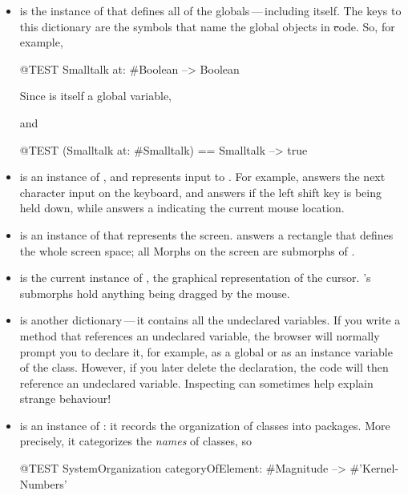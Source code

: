 \documentclass[a4paper,10pt,twoside]{book}
\begin{document}
\begin{itemize}
\item
{} is the instance of  that defines all of the globals\,---\,including  itself.   
The keys to this dictionary are the symbols that name the global objects in \st code.
So, for example,
\begin{code}{@TEST}
Smalltalk at: #Boolean --> Boolean
\end{code}
Since  is itself a global variable,
\begin{code}{}
Smalltalk at: #Smalltalk-->a SystemDictionary(lots of globals)}
\end{code} 
and
\begin{code}{@TEST}
(Smalltalk at: #Smalltalk) == Smalltalk --> true
\end{code}

\item {} is an instance of , and represents input to \squeak.
For example,  answers the next character input on the keyboard, and  answers  if the left shift key is being held down, while  answers a  indicating the current mouse location.

\item {} is an instance of  that represents the screen.
 answers a rectangle that defines the whole screen space; all Morphs on the screen are submorphs of .

\item 
{} is the current instance of , the graphical representation of the cursor.  's submorphs hold anything being dragged by the mouse.

\item
{} is another dictionary\,---\,it contains all the undeclared variables.
If you write a method that references an undeclared variable, the browser will normally
prompt you to declare it, for example, as a global or as an instance variable of the class.
However, if you later delete the declaration, the code will then reference an undeclared variable.
Inspecting  can sometimes help explain strange behaviour!

\item
{} is an instance of : it records the organization of classes into packages.  More precisely, it categorizes the \emph{names} of classes, so
\begin{code}{@TEST}
SystemOrganization categoryOfElement: #Magnitude --> #'Kernel-Numbers'
\end{code}

\end{itemize}
\end{document}
